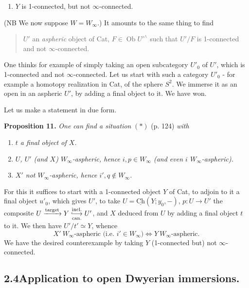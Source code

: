 \documentclass[11pt]{article}
\newcommand{\printedpage}[1]{\marginpar{\footnotesize p.~#1}}
\newcommand{\msp}[1]{\marginpar{\footnotesize [#1]}}
\newcommand{\hra}{\lhook\joinrel\longrightarrow}
\begin{document}
\begin{enumerate}[label=\alph*), start=3]
\item \printedpage{74}
$Y$ is 1-connected, but not $\infty$-connected.
\end{enumerate}

(NB We now suppose $W=W_\infty$.) It amounts to the same thing to find

\begin{quote}
$U'$ an \textit{aspheric} object of Cat, $F\in\operatorname{Ob}U'^\wedge$ such that $U'/F$ is 1-connected and not $\infty$-connected.
\end{quote}

One thinks for example of simply taking an open subcategory $U'_0$ of $U'$, which is 1-connected and not $\infty$-connected. Let us start with such a category $U'_0$ - for example a homotopy realization in Cat, of the sphere $S^2$. We immerse it as an open in an aspheric $U'$, by adding a final object to it. We have won.

\msp{page 107}

Let us make a statement in due form.

\textbf{Proposition 11.} \textit{One can find a situation} $(*)$ (p. 124) \textit{with}

\begin{enumerate}[label=\textit{\alph*)}]
\item \textit{$t$ a final object of $X$.}
\item \textit{$U$, $U'$ (and $X$) $W_\infty$-aspheric, hence $i,p\in W_\infty$ (and even $i$ $W_\infty$-aspheric).}
\item \textit{$X'$ not $W_\infty$-aspheric, hence $i',q\notin W_\infty$.}
\end{enumerate}

For this it suffices to start with a 1-connected object $Y$ of Cat, to adjoin to it a final object $u'_0$, which gives $U'$, to take $U=\underline{\mathrm{Ch}}(Y;y_0,-)$, $p:U\longrightarrow U'$ the composite $U\xrightarrow{\text{target}}Y\underset{\text{can.}}{\overset{\text{incl.}}{\hra}}U'$, and $X$ deduced from $U$ by adding a final object $t$ to it. We then have $U'/t'\simeq Y$, whence
\[ X'\ W_\infty\text{-aspheric (i.e. }i'\in W_\infty)\Longleftrightarrow Y\ W_\infty\text{-aspheric.} \]
We have the desired counterexample by taking $Y$ (1-connected but) not $\infty$-connected.

\subsection*{2.4\quad Application to open Dwyerian immersions.}
\end{document}
